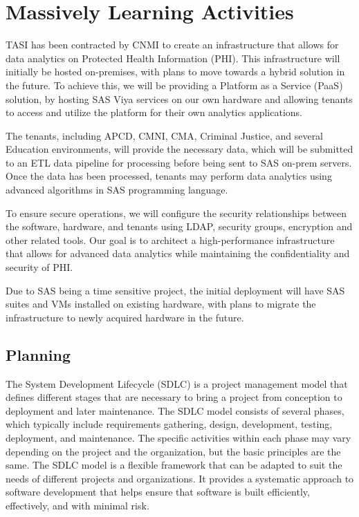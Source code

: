 \section{Massively Learning Activities} \label{section: MLA}
TASI has been contracted by CNMI to create an infrastructure that allows for data analytics on Protected Health Information (PHI). This infrastructure will initially be hosted on-premises, with plans to move towards a hybrid solution in the future. To achieve this, we will be providing a Platform as a Service (PaaS) solution, by hosting SAS Viya services on our own hardware and allowing tenants to access and utilize the platform for their own analytics applications.

The tenants, including APCD, CMNI, CMA, Criminal Justice, and several Education environments, will provide the necessary data, which will be submitted to an ETL data pipeline for processing before being sent to SAS on-prem servers. Once the data has been processed, tenants may perform data analytics using advanced algorithms in SAS programming language.

To ensure secure operations, we will configure the security relationships between the software, hardware, and tenants using LDAP, security groups, encryption  and other related tools. Our goal is to architect a high-performance infrastructure that allows for advanced data analytics while maintaining the confidentiality and security of PHI.

Due to SAS being a time sensitive project, the initial deployment will have SAS suites and VMs installed on existing hardware, with plans to migrate the infrastructure to newly acquired hardware in the future.

\subsection{Planning}

The System Development Lifecycle (SDLC) is a project management model that defines different stages that are necessary to bring a project from conception to deployment and later maintenance. The SDLC model consists of several phases, which typically include requirements gathering, design, development, testing, deployment, and maintenance. The specific activities within each phase may vary depending on the project and the organization, but the basic principles are the same. The SDLC model is a flexible framework that can be adapted to suit the needs of different projects and organizations. It provides a systematic approach to software development that helps ensure that software is built efficiently, effectively, and with minimal risk.

